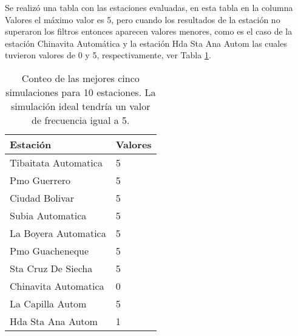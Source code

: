 Se realizó una tabla con las estaciones evaluadas, en esta tabla en la columna Valores el máximo valor es 5, pero cuando los resultados de la estación no superaron los filtros entonces aparecen valores menores, como es el caso de la estación Chinavita Automática y la estación Hda Sta Ana Autom las cuales tuvieron valores de 0 y 5, respectivamente, ver Tabla \ref{Tabla_mejores_5_dominio}.\\

\begin{table}[]
\centering
\caption{Conteo de las mejores cinco simulaciones para 10 estaciones. La simulación ideal tendría un valor de frecuencia igual a 5.}
\begin{tabular}{ll}
Estación &  Valores \\ \hline
Tibaitata Automatica & 5 \\
Pmo Guerrero & 5\\
Ciudad Bolivar & 5\\
Subia Automatica & 5 \\
La Boyera Automatica & 5\\
Pmo Guacheneque & 5\\
Sta Cruz De Siecha & 5\\
Chinavita Automatica & 0 \\
La Capilla Autom & 5 \\
Hda Sta Ana Autom & 1\\
\end{tabular}
\label{Tabla_mejores_5_dominio}
\end{table}



